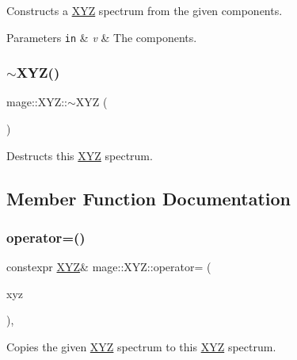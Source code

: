 Constructs a \hyperlink{structmage_1_1_x_y_z}{X\+YZ} spectrum from the given components.


\begin{DoxyParams}[1]{Parameters}
\mbox{\tt in}  & {\em v} & The components. \\
\hline
\end{DoxyParams}
\hypertarget{structmage_1_1_x_y_z_a07eb7ce1ad3308774b0bbad3a7f121ce}{}\label{structmage_1_1_x_y_z_a07eb7ce1ad3308774b0bbad3a7f121ce} 
\subsubsection{\texorpdfstring{$\sim$\+X\+Y\+Z()}{~XYZ()}}
{\footnotesize\ttfamily mage\+::\+X\+Y\+Z\+::$\sim$\+X\+YZ (\begin{DoxyParamCaption}{ }\end{DoxyParamCaption})\hspace{0.3cm}{\ttfamily [default]}}

Destructs this \hyperlink{structmage_1_1_x_y_z}{X\+YZ} spectrum. 

\subsection{Member Function Documentation}
\hypertarget{structmage_1_1_x_y_z_acf2ea9538d1f6a496557d3d0f2538a0c}{}\label{structmage_1_1_x_y_z_acf2ea9538d1f6a496557d3d0f2538a0c} 
\subsubsection{\texorpdfstring{operator=()}{operator=()}\hspace{0.1cm}{\footnotesize\ttfamily [1/2]}}
{\footnotesize\ttfamily constexpr \hyperlink{structmage_1_1_x_y_z}{X\+YZ}\& mage\+::\+X\+Y\+Z\+::operator= (\begin{DoxyParamCaption}\item[{const \hyperlink{structmage_1_1_x_y_z}{X\+YZ} \&}]{xyz }\end{DoxyParamCaption})\hspace{0.3cm}{\ttfamily [default]}, {\ttfamily [noexcept]}}

Copies the given \hyperlink{structmage_1_1_x_y_z}{X\+YZ} spectrum to this \hyperlink{structmage_1_1_x_y_z}{X\+YZ} spectrum.


